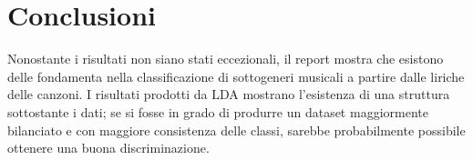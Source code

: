 \documentclass[technote]{IEEEtran}
\begin{document}
\section{Conclusioni}
Nonostante i risultati non siano stati eccezionali, il report mostra che 
esistono delle fondamenta nella classificazione di sottogeneri musicali a 
partire dalle liriche delle canzoni. I risultati prodotti da LDA mostrano 
l'esistenza
di una struttura sottostante i dati; se si fosse in grado di
produrre un dataset maggiormente bilanciato
e con maggiore consistenza delle classi, sarebbe probabilmente possibile
ottenere una buona discriminazione. 


\end{document}
